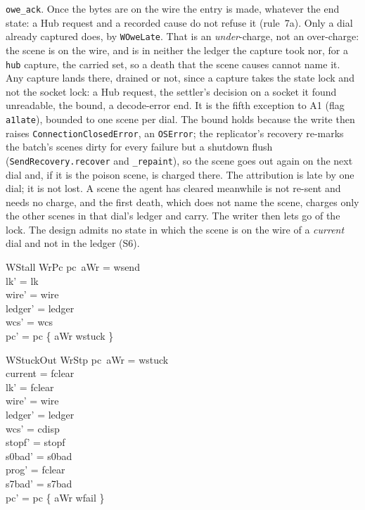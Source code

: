 \documentclass[a4paper,10pt,fleqn]{article}
\begin{document}
\texttt{owe\_ack}.  Once the bytes are on the wire the entry is made, whatever the
end state: a Hub request and a recorded cause do not refuse it (rule~7a).  Only a
dial already captured does, by \texttt{WOweLate}.  That is an \emph{under}-charge,
not an over-charge: the scene is on the wire, and is in neither the ledger the
capture took nor, for a \texttt{hub} capture, the carried set, so a death that
the scene causes cannot name it.  Any capture lands there, drained or not, since
a capture takes the state lock and not the socket lock: a Hub request, the
settler's decision on a socket it found unreadable, the bound, a decode-error
end.  It is the fifth exception to A1 (flag \texttt{a1late}), bounded to one
scene per dial.  The bound holds because the write then raises
\texttt{ConnectionClosedError}, an \texttt{OSError}; the replicator's recovery
re-marks the batch's scenes dirty for every failure but a shutdown flush
(\texttt{SendRecovery.recover} and \texttt{\_repaint}), so the scene goes out
again on the next dial and, if it is the poison scene, is charged there.  The
attribution is late by one dial; it is not lost.  A scene the agent has cleared
meanwhile is not re-sent and needs no charge, and the first death, which does
not name the scene, charges only the other scenes in that dial's ledger and
carry.  The writer then lets go of the
lock.  The design admits no state in which the scene is on the wire of a
\emph{current} dial and not in the ledger (S6).

\begin{schema}{WStall}
  WrPc
\where
  pc~aWr = wsend \\
  lk' = lk \\
  wire' = wire \\
  ledger' = ledger \\
  wcs' = wcs \\
  pc' = pc \oplus \{ aWr \mapsto wstuck \}
\end{schema}

\begin{schema}{WStuckOut}
  WrStp
\where
  pc~aWr = wstuck \\
  current = fclear \\
  lk' = fclear \\
  wire' = wire \\
  ledger' = ledger \\
  wcs' = cdisp \\
  stopf' = stopf \\
  s0bad' = s0bad \\
  prog' = fclear \\
  s7bad' = s7bad \\
  pc' = pc \oplus \{ aWr \mapsto wfail \}
\end{schema}
\end{document}
